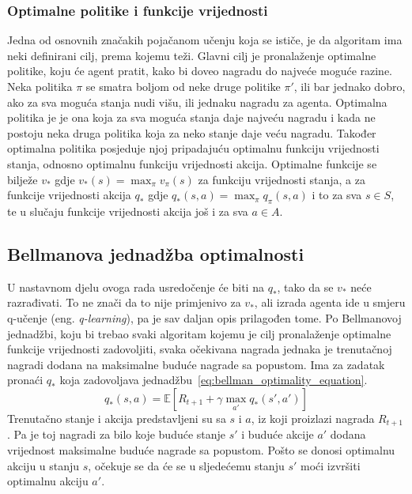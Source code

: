 \subsubsection{Optimalne politike i funkcije vrijednosti}
Jedna od osnovnih značakih pojačanom učenju koja se ističe, je da algoritam ima neki definirani cilj, prema kojemu teži. Glavni cilj je pronalaženje optimalne politike, koju će agent pratit, kako bi doveo nagradu do najveće moguće razine. Neka politika $\pi$ se smatra boljom od neke druge politike $\pi'$, ili bar jednako dobro, ako za sva moguća stanja nudi višu, ili jednaku nagradu za agenta. Optimalna politika je je ona koja za sva moguća stanja daje najveću nagradu i kada ne postoju neka druga politika koja za neko stanje daje veću nagradu. Također optimalna politika posjeduje njoj pripadajuću optimalnu funkciju vrijednosti stanja, odnosno optimalnu funkciju vrijednosti akcija. Optimalne funkcije se bilježe $v_*$ gdje $v_*(s) = \max_\pi v_\pi(s)$ za funkciju vrijednosti stanja, a za funkcije vrijednosti akcija $q_*$ gdje $q_*(s, a) = \max_\pi q_\pi(s, a)$ i to za sva $s \in S$, te u slučaju funkcije vrijednosti akcija još i za sva $a \in A$.

\subsection{Bellmanova jednadžba optimalnosti}
U nastavnom djelu ovoga rada usredočenje će biti na $q_*$, tako da se $v_*$ neće razrađivati. To ne znači da to nije primjenivo za $v_*$, ali izrada agenta ide u smjeru q-učenje (eng. \textit{q-learning}), pa je sav daljan opis prilagođen tome. 
Po Bellmanovoj jednadžbi, koju bi trebao svaki algoritam kojemu je cilj pronalaženje optimalne funkcije vrijednosti zadovoljiti, svaka očekivana nagrada jednaka je trenutačnoj nagradi dodana na maksimalne buduće nagrade sa popustom. Ima za zadatak pronaći $q_*$ koja zadovoljava jednadžbu~\ref{eq:bellman_optimality_equation}.
\begin{equation}\label{eq:bellman_optimality_equation}
q_*(s, a) = \mathbb{E}\left[R_{t+1} + \gamma\max_{a'}q_*(s', a')\right]
\end{equation}
Trenutačno stanje i akcija predstavljeni su sa $s$ i $a$, iz koji proizlazi nagrada $R_{t+1}$. Pa je toj nagradi za bilo koje buduće stanje $s'$ i buduće akcije $a'$ dodana vrijednost maksimalne buduće nagrade sa popustom. Pošto se donosi optimalnu akciju u stanju $s$, očekuje se da će se u sljedećemu stanju $s'$ moći izvršiti optimalnu akciju $a'$.

